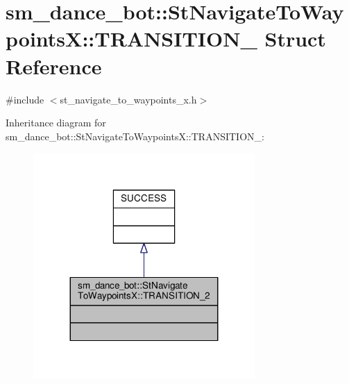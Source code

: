 \hypertarget{structsm__dance__bot_1_1StNavigateToWaypointsX_1_1TRANSITION__2}{}\section{sm\+\_\+dance\+\_\+bot\+:\+:St\+Navigate\+To\+WaypointsX\+:\+:T\+R\+A\+N\+S\+I\+T\+I\+O\+N\+\_ Struct Reference}
\label{structsm__dance__bot_1_1StNavigateToWaypointsX_1_1TRANSITION__2}


{\ttfamily \#include $<$st\+\_\+navigate\+\_\+to\+\_\+waypoints\+\_\+x.\+h$>$}



Inheritance diagram for sm\+\_\+dance\+\_\+bot\+:\+:St\+Navigate\+To\+WaypointsX\+:\+:T\+R\+A\+N\+S\+I\+T\+I\+O\+N\+\_\+:\nopagebreak
\begin{figure}[H]
\begin{center}
\leavevmode
\includegraphics[width=239pt]{structsm__dance__bot_1_1StNavigateToWaypointsX_1_1TRANSITION__2__inherit__graph}
\end{center}
\end{figure}


